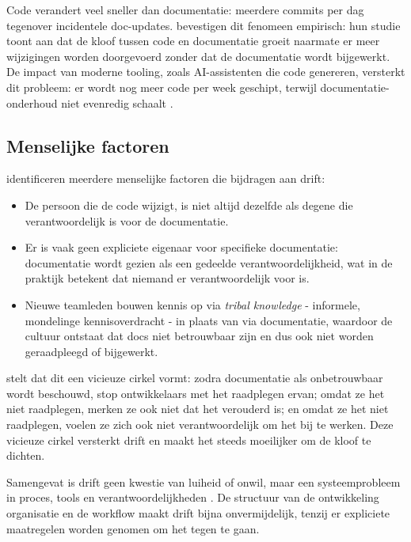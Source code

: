 Code verandert veel sneller dan documentatie: meerdere commits per dag tegenover incidentele doc-updates. \textcite{romeo2024didrift} bevestigen dit fenomeen empirisch: hun studie toont aan dat de kloof tussen code en documentatie groeit naarmate er meer wijzigingen worden doorgevoerd zonder dat de documentatie wordt bijgewerkt. De impact van moderne tooling, zoals AI-assistenten die code genereren, versterkt dit probleem: er wordt nog meer code per week geschipt, terwijl documentatie-onderhoud niet evenredig schaalt \autocite{theunissen2022mappingdocumentation}.

\subsection{Menselijke factoren}
\textcite{bhatti2021docsdevelopers} identificeren meerdere menselijke factoren die bijdragen aan drift:

\begin{itemize}
    \item De persoon die de code wijzigt, is niet altijd dezelfde als degene die verantwoordelijk is voor de documentatie.
    \item Er is vaak geen expliciete eigenaar voor specifieke documentatie: documentatie wordt gezien als een gedeelde verantwoordelijkheid, wat in de praktijk betekent dat niemand er verantwoordelijk voor is.
    \item Nieuwe teamleden bouwen kennis op via \textit{tribal knowledge} - informele, mondelinge kennisoverdracht - in plaats van via documentatie, waardoor de cultuur ontstaat dat docs niet betrouwbaar zijn en dus ook niet worden geraadpleegd of bijgewerkt.
\end{itemize}

\textcite{gentle2017docslikecode} stelt dat dit een vicieuze cirkel vormt: zodra documentatie als onbetrouwbaar wordt beschouwd, stop ontwikkelaars met het raadplegen ervan; omdat ze het niet raadplegen, merken ze ook niet dat het verouderd is; en omdat ze het niet raadplegen, voelen ze zich ook niet verantwoordelijk om het bij te werken. Deze vicieuze cirkel versterkt drift en maakt het steeds moeilijker om de kloof te dichten.

Samengevat is drift geen kwestie van luiheid of onwil, maar een systeemprobleem in proces, tools en verantwoordelijkheden \autocite{theunissen2022mappingdocumentation}. De structuur van de ontwikkeling organisatie en de workflow maakt drift bijna onvermijdelijk, tenzij er expliciete maatregelen worden genomen om het tegen te gaan.

